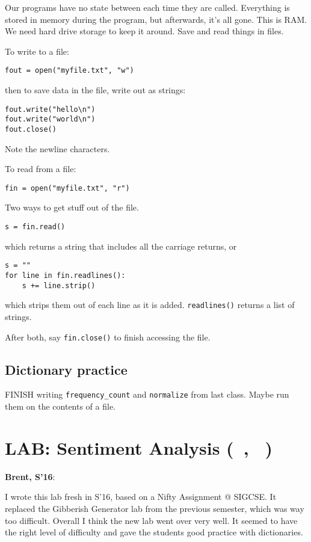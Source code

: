 \documentclass{article}
\newenvironment{reflect}[1]
{
  \noindent
  \begin{lrbox}{\reflectbox}
    \begin{minipage}[t]{\textwidth}
      \textbf{#1}:
}{
    \end{minipage}
  \end{lrbox}
  \fbox{\usebox{\reflectbox}}
}
\newcommand{\notready}{\textcolor{red}{\XSolidBold}\xspace}
\newcommand{\shortmonthname}{\StrLeft{\datemonthname}{3}}
\newcommand{\showdate}{\thedateday\ \shortmonthname}
\newcommand{\lab}[1]{\section*{LAB: #1 (\showdate\nextdate, \showdate)}}
\begin{document}
Our programs have no state between each time they are called.
Everything is stored in memory during the program, but afterwards,
it's all gone.  This is RAM.  We need hard drive storage to keep it
around.  Save and read things in files.

To write to a file:

\begin{verbatim}
fout = open("myfile.txt", "w")
\end{verbatim}

then to save data in the file, write out as strings:

\begin{verbatim}
fout.write("hello\n")
fout.write("world\n")
fout.close()
\end{verbatim}
Note the newline characters.

To read from a file:

\begin{verbatim}
fin = open("myfile.txt", "r")
\end{verbatim}

Two ways to get stuff out of the file.

\begin{verbatim}
s = fin.read()
\end{verbatim}

which returns a string that includes all the carriage returns, or

\begin{verbatim}
s = ""
for line in fin.readlines():
    s += line.strip()
\end{verbatim}

which strips them out of each line as it is added. \verb|readlines()|
returns a list of strings.

After both, say \verb|fin.close()| to finish accessing the file.

\subsection*{Dictionary practice}

FINISH writing \verb|frequency_count| and \verb|normalize| from last
class.  Maybe run them on the contents of a file.

\newpage
\lab{\notready Sentiment Analysis}

\begin{reflect}{Brent, S'16}
  I wrote this lab fresh in S'16, based on a Nifty Assignment @
  SIGCSE.  It replaced the Gibberish Generator lab from the previous
  semester, which was way too difficult.  Overall I think the new lab
  went over very well.  It seemed to have the right level of
  difficulty and gave the students good practice with dictionaries.
\end{reflect}
\end{document}
